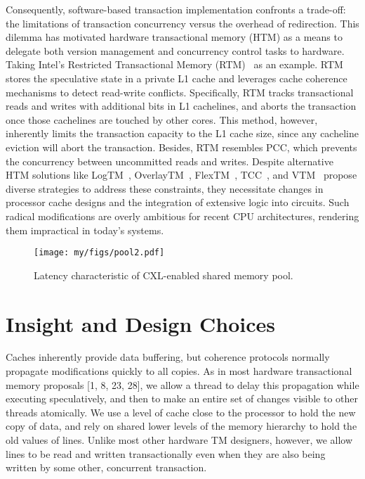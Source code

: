 Consequently, software-based transaction implementation confronts a trade-off: the limitations of transaction concurrency versus the overhead of redirection. This dilemma has motivated hardware transactional memory (HTM)\cite{drtm, dhtm_isca18, dudetm_asplos17} as a means to delegate both version management and concurrency control tasks to hardware. Taking Intel's Restricted Transactional Memory (RTM)~\cite{rtm} as an example. RTM stores the speculative state in a private L1 cache and leverages cache coherence mechanisms to detect read-write conflicts.  Specifically, RTM tracks transactional reads and writes with additional bits in L1 cachelines, and aborts the transaction once those cachelines are touched by other cores. This method, however, inherently limits the transaction capacity to the L1 cache size, since any cacheline eviction will abort the transaction. Besides, RTM resembles PCC, which prevents the concurrency between uncommitted reads and writes. Despite alternative HTM solutions like LogTM~\cite{logtm_hpca06}, OverlayTM~\cite{overlaytm_pact19}, FlexTM~\cite{flextm_isca08}, TCC~\cite{tcc_isca04}, and VTM~\cite{vtm_isca05} propose diverse strategies to address these constraints, they necessitate changes in processor cache designs and the integration of extensive logic into circuits. Such radical modifications are overly ambitious for recent CPU architectures, rendering them impractical in today's systems.  




\begin{figure}[t]
  \centering 
  \texttt{[image: my/figs/pool2.pdf]}
  \caption{Latency characteristic of CXL-enabled shared memory pool.}
  \label{fig:motivation-cxl-latency}
\end{figure}

\section{Insight and Design Choices}

Caches inherently provide data buffering, but coherence protocols normally propagate modifications quickly to all copies. As in most hardware transactional memory proposals [1, 8, 23, 28], we allow a thread to delay this propagation while executing speculatively, and then to make an entire set of changes visible to other threads atomically. We use a level of cache close to the processor to hold the new copy of data, and rely on shared lower levels of the memory hierarchy to hold the old values of lines. Unlike most other hardware TM designers, however, we allow lines to be read and written transactionally even when they are also being written by some other, concurrent transaction.

